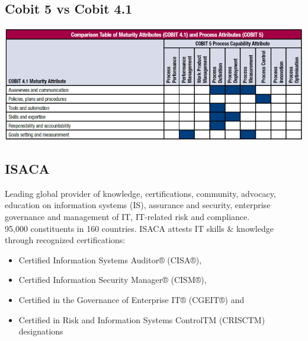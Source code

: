 \documentclass[8pt]{extarticle}
\begin{document}
\begin{multicols}{3}
\subsection{Cobit 5 vs Cobit 4.1}
\begin{center}
    \begin{minipage}{\columnwidth}
        \includegraphics[width=\columnwidth]{cobit5-vs-cobit41.png}
    \end{minipage}
\end{center}

\subsection{ISACA}
Leading global provider of knowledge, certifications, community, advocacy, education on information systems (IS), 
assurance and security, enterprise governance and management of IT, IT-related risk and compliance.\\
95,000 constituents in 160 countries. ISACA attests IT skills \& knowledge through recognized certifications:
\begin{itemize}
    \item Certified Information Systems Auditor® (CISA®),
    \item Certified Information Security Manager® (CISM®),
    \item Certified in the Governance of Enterprise IT® (CGEIT®) and
    \item Certified in Risk and Information Systems ControlTM (CRISCTM) designations
\end{itemize}


\end{multicols}
\end{document}
